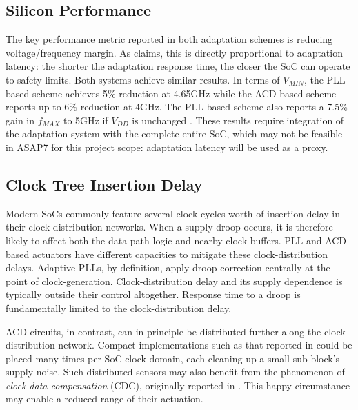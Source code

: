 \documentclass[twoside,9pt,journal,letterpage]{IEEEtran}
\begin{document}
\subsection{Silicon Performance}
\label{sec:performance}
The key performance metric reported in both adaptation schemes is reducing voltage/frequency margin. As \cite{hashimoto2018} claims, this is directly proportional to adaptation latency: the shorter the adaptation response time, the closer the SoC can operate to safety limits. Both systems achieve similar results. In terms of $V_{MIN}$, the PLL-based scheme achieves 5\% reduction at 4.65GHz \cite{hashimoto2018} while the ACD-based scheme reports up to 6\% reduction \cite{wilcox2015} at 4GHz. The PLL-based scheme also reports a 7.5\% gain in $f_{MAX}$ to 5GHz if $V_{DD}$ is unchanged \cite{hashimoto2018}. These results require integration of the adaptation system with the complete entire SoC, which may not be feasible in ASAP7 for this project scope: adaptation latency will be used as a proxy.

\subsection{Clock Tree Insertion Delay}
\label{sec:clktree}

Modern SoCs commonly feature several clock-cycles worth of insertion delay in their clock-distribution networks. When a supply droop occurs, it is therefore likely to affect both the data-path logic and nearby clock-buffers. PLL and ACD-based actuators have different capacities to mitigate these clock-distribution delays. Adaptive PLLs, by definition, apply droop-correction centrally at the point of clock-generation. Clock-distribution delay and its supply dependence is typically outside their control altogether. Response time to a droop is fundamentally limited to the clock-distribution delay. 

ACD circuits, in contrast, can in principle be distributed further along the clock-distribution network. Compact implementations such as that reported in \cite{kwak2016self} could be placed many times per SoC clock-domain, each cleaning up a small sub-block's supply noise. Such distributed sensors may also benefit from the phenomenon of \textit{clock-data compensation} (CDC), originally reported in \cite{wong2006enhancing}. This happy circumstance may enable a reduced range of their actuation. 
\end{document}
